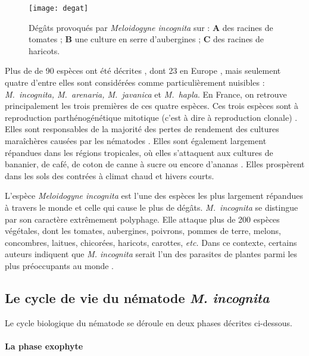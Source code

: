 	\begin{figure}
	    \centering
		  \texttt{[image: degat]}
		  \caption[Dégâts provoqués par \textit{ Meloidogyne incognita}]{Dégâts provoqués par \textit{ Meloidogyne 
		   incognita} sur : \textbf{A} des racines de tomates ;
		   \textbf{B}  une culture en serre d’aubergines ; \textbf{C} 
		   des racines de haricots.}
		  \label{degat}
	\end{figure}

	Plus de de 90 espèces ont été décrites \citep{Jones2013, Blok2008}, dont 23 en Europe \citep{Wesemael2011}, mais seulement quatre d'entre elles sont considérées comme particulièrement nuisibles : \textit{M.~incognita, M.~arenaria, M.~javanica} et  \textit{M.~hapla}. En France, on retrouve principalement les trois premières de ces quatre espèces.  Ces trois espèces sont à reproduction parthénogénétique mitotique   (c'est à dire à reproduction clonale) \citep{Triantaphyllou1985}. Elles sont responsables de
la majorité des pertes de rendement des cultures maraîchères causées par les
nématodes \citep{Sikora2005}. Elles sont également largement répandues dans les régions tropicales, où elles s’attaquent aux cultures de
bananier, de café, de coton de canne à sucre ou encore d’ananas \citep{Sikora2018}. Elles  prospèrent dans les sols des contrées à climat chaud et hivers courts.

	L'espèce \textit{Meloidogyne incognita} est   l'une des espèces les plus largement répandues à travers le monde et celle qui cause le plus de dégâts. \textit{M.~incognita} se distingue par son caractère extrêmement polyphage. Elle attaque plus de 200 espèces végétales, dont les tomates, aubergines, poivrons, pommes de terre, melons, concombres, laitues, chicorées, haricots, carottes, \textit{etc.} 
	Dans ce contexte, certains auteurs indiquent que \textit{M. incognita} serait l'un des parasites de plantes parmi les plus préoccupants au monde \citep{Bebber2014}. 	
	

\subsection{Le cycle de vie du nématode \textit{M. incognita}}
\label{sec:cycle}
 
 
Le cycle biologique  du nématode se déroule en  deux phases décrites ci-dessous.

\paragraph{La phase exophyte}

